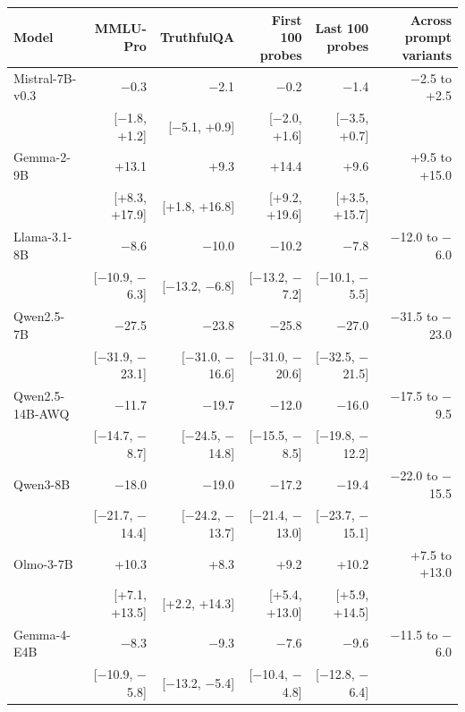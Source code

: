 \begin{tabular}{lrrrrr}
\toprule
Model & MMLU-Pro & TruthfulQA & First 100 probes & Last 100 probes & Across prompt variants \\
\midrule
Mistral-7B-v0.3 & $-$0.3 & $-$2.1 & $-$0.2 & $-$1.4 & $-$2.5 to +2.5 \\
 & [$-$1.8, +1.2] & [$-$5.1, +0.9] & [$-$2.0, +1.6] & [$-$3.5, +0.7] &  \\[2pt]
Gemma-2-9B & +13.1 & +9.3 & +14.4 & +9.6 & +9.5 to +15.0 \\
 & [+8.3, +17.9] & [+1.8, +16.8] & [+9.2, +19.6] & [+3.5, +15.7] &  \\[2pt]
Llama-3.1-8B & $-$8.6 & $-$10.0 & $-$10.2 & $-$7.8 & $-$12.0 to $-$6.0 \\
 & [$-$10.9, $-$6.3] & [$-$13.2, $-$6.8] & [$-$13.2, $-$7.2] & [$-$10.1, $-$5.5] &  \\[2pt]
Qwen2.5-7B & $-$27.5 & $-$23.8 & $-$25.8 & $-$27.0 & $-$31.5 to $-$23.0 \\
 & [$-$31.9, $-$23.1] & [$-$31.0, $-$16.6] & [$-$31.0, $-$20.6] & [$-$32.5, $-$21.5] &  \\[2pt]
Qwen2.5-14B-AWQ & $-$11.7 & $-$19.7 & $-$12.0 & $-$16.0 & $-$17.5 to $-$9.5 \\
 & [$-$14.7, $-$8.7] & [$-$24.5, $-$14.8] & [$-$15.5, $-$8.5] & [$-$19.8, $-$12.2] &  \\[2pt]
Qwen3-8B & $-$18.0 & $-$19.0 & $-$17.2 & $-$19.4 & $-$22.0 to $-$15.5 \\
 & [$-$21.7, $-$14.4] & [$-$24.2, $-$13.7] & [$-$21.4, $-$13.0] & [$-$23.7, $-$15.1] &  \\[2pt]
Olmo-3-7B & +10.3 & +8.3 & +9.2 & +10.2 & +7.5 to +13.0 \\
 & [+7.1, +13.5] & [+2.2, +14.3] & [+5.4, +13.0] & [+5.9, +14.5] &  \\[2pt]
Gemma-4-E4B & $-$8.3 & $-$9.3 & $-$7.6 & $-$9.6 & $-$11.5 to $-$6.0 \\
 & [$-$10.9, $-$5.8] & [$-$13.2, $-$5.4] & [$-$10.4, $-$4.8] & [$-$12.8, $-$6.4] &  \\
\bottomrule
\end{tabular}
